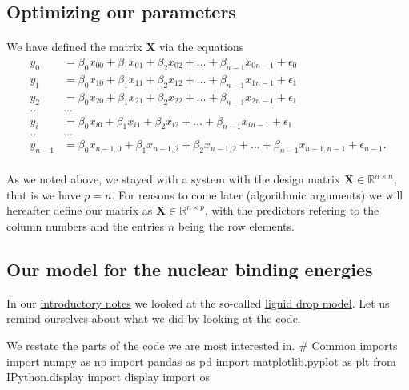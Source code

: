 \documentclass[%
oneside,                 %
final,                   %
10pt]{article}
\begin{document}
\subsection{Optimizing our parameters}

\paragraph{}
We have defined the matrix $\bm{X}$ via the equations
\begin{align*}
y_0&=\beta_0x_{00}+\beta_1x_{01}+\beta_2x_{02}+\dots+\beta_{n-1}x_{0n-1}+\epsilon_0\\
y_1&=\beta_0x_{10}+\beta_1x_{11}+\beta_2x_{12}+\dots+\beta_{n-1}x_{1n-1}+\epsilon_1\\
y_2&=\beta_0x_{20}+\beta_1x_{21}+\beta_2x_{22}+\dots+\beta_{n-1}x_{2n-1}+\epsilon_1\\
\dots & \dots \\
y_{i}&=\beta_0x_{i0}+\beta_1x_{i1}+\beta_2x_{i2}+\dots+\beta_{n-1}x_{in-1}+\epsilon_1\\
\dots & \dots \\
y_{n-1}&=\beta_0x_{n-1,0}+\beta_1x_{n-1,2}+\beta_2x_{n-1,2}+\dots+\beta_{n-1}x_{n-1,n-1}+\epsilon_{n-1}.\\
\end{align*}

As we noted above, we stayed with a system with the design matrix 
 $\bm{X}\in {\mathbb{R}}^{n\times n}$, that is we have $p=n$. For reasons to come later (algorithmic arguments) we will hereafter define 
our matrix as $\bm{X}\in {\mathbb{R}}^{n\times p}$, with the predictors refering to the column numbers and the entries $n$ being the row elements.




\subsection{Our model for the nuclear binding energies}

In our \href{{https://compphysics.github.io/MachineLearningMSU/doc/pub/Introduction/html/Introduction.html}}{introductory notes} we looked at the so-called \href{{https://en.wikipedia.org/wiki/Semi-empirical_mass_formula}}{liguid drop model}. Let us remind ourselves about what we did by looking at the code.

We restate the parts of the code we are most interested in.
\bpycod
# Common imports
import numpy as np
import pandas as pd
import matplotlib.pyplot as plt
from IPython.display import display
import os
\end{document}
